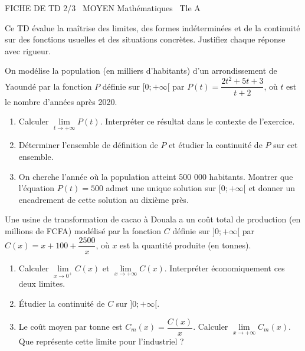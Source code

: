 \documentclass[11pt]{article}
\begin{document}
\begin{tcolorbox}[enhanced,colback=popink,colframe=popink,arc=10pt,boxrule=0pt,left=12pt,right=12pt,top=9pt,bottom=9pt]
{\color{white}\popxbold\small FICHE DE TD 2/3 \textbullet\ MOYEN \hfill Mathématiques \textbullet\ Tle A\par}
\end{tcolorbox}
\vspace{4pt}
Ce TD évalue la maîtrise des limites, des formes indéterminées et de la continuité sur des fonctions usuelles et des situations concrètes. Justifiez chaque réponse avec rigueur.

\begin{exercice}
On modélise la population (en milliers d'habitants) d'un arrondissement de Yaoundé par la fonction $P$ définie sur $[0; +\infty[$ par $P(t) = \dfrac{2t^2 + 5t + 3}{t + 2}$, où $t$ est le nombre d'années après 2020.
\begin{enumerate}
    \item Calculer $\lim\limits_{t \to +\infty} P(t)$. Interpréter ce résultat dans le contexte de l'exercice.
    \item Déterminer l'ensemble de définition de $P$ et étudier la continuité de $P$ sur cet ensemble.
    \item On cherche l'année où la population atteint 500 000 habitants. Montrer que l'équation $P(t) = 500$ admet une unique solution sur $[0; +\infty[$ et donner un encadrement de cette solution au dixième près.
\end{enumerate}
\end{exercice}

\begin{exercice}
Une usine de transformation de cacao à Douala a un coût total de production (en millions de FCFA) modélisé par la fonction $C$ définie sur $]0; +\infty[$ par $C(x) = x + 100 + \dfrac{2500}{x}$, où $x$ est la quantité produite (en tonnes).
\begin{enumerate}
    \item Calculer $\lim\limits_{x \to 0^+} C(x)$ et $\lim\limits_{x \to +\infty} C(x)$. Interpréter économiquement ces deux limites.
    \item Étudier la continuité de $C$ sur $]0; +\infty[$.
    \item Le coût moyen par tonne est $C_m(x) = \dfrac{C(x)}{x}$. Calculer $\lim\limits_{x \to +\infty} C_m(x)$. Que représente cette limite pour l'industriel ?
\end{enumerate}
\end{exercice}
\end{document}

